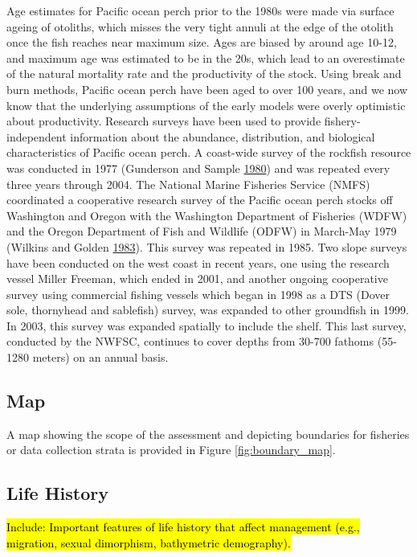 \documentclass[12pt,]{article}
\begin{document}
Age estimates for Pacific ocean perch prior to the 1980s were made via
surface ageing of otoliths, which misses the very tight annuli at the
edge of the otolith once the fish reaches near maximum size. Ages are
biased by around age 10-12, and maximum age was estimated to be in the
20s, which lead to an overestimate of the natural mortality rate and the
productivity of the stock. Using break and burn methods, Pacific ocean
perch have been aged to over 100 years, and we now know that the
underlying assumptions of the early models were overly optimistic about
productivity. Research surveys have been used to provide
fishery-independent information about the abundance, distribution, and
biological characteristics of Pacific ocean perch. A coast-wide survey
of the rockfish resource was conducted in 1977 (Gunderson and Sample
\protect\hyperlink{ref-gunderson_distribution_1980}{1980}) and was
repeated every three years through 2004. The National Marine Fisheries
Service (NMFS) coordinated a cooperative research survey of the Pacific
ocean perch stocks off Washington and Oregon with the Washington
Department of Fisheries (WDFW) and the Oregon Department of Fish and
Wildlife (ODFW) in March-May 1979 (Wilkins and Golden
\protect\hyperlink{ref-wilkins_condition_1983}{1983}). This survey was
repeated in 1985. Two slope surveys have been conducted on the west
coast in recent years, one using the research vessel Miller Freeman,
which ended in 2001, and another ongoing cooperative survey using
commercial fishing vessels which began in 1998 as a DTS (Dover sole,
thornyhead and sablefish) survey, was expanded to other groundfish in
1999. In 2003, this survey was expanded spatially to include the shelf.
This last survey, conducted by the NWFSC, continues to cover depths from
30-700 fathoms (55-1280 meters) on an annual basis.

\subsection{Map}\label{map}

A map showing the scope of the assessment and depicting boundaries for
fisheries or data collection strata is provided in Figure
\ref{fig:boundary_map}.

\subsection{Life History}\label{life-history}

\hl{Include: Important features of life history that affect management (e.g., migration, 
sexual dimorphism, bathymetric demography).}
\end{document}

